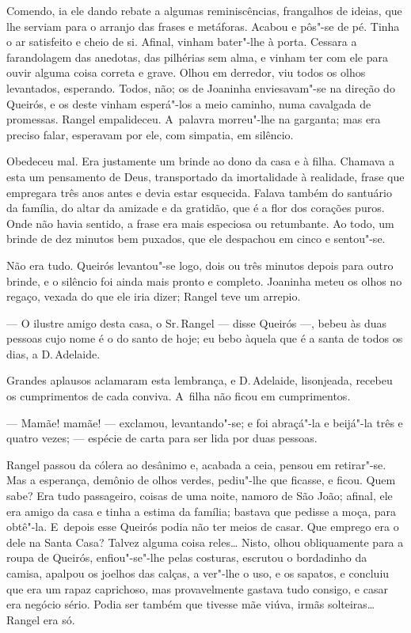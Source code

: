 \begin{linenumbers}
Comendo, ia ele dando rebate a algumas reminiscências, frangalhos de
ideias, que lhe serviam para o arranjo das frases e metáforas. Acabou e
pôs"-se de pé. Tinha o ar satisfeito e cheio de si. Afinal, vinham
bater"-lhe à porta. Cessara a farandolagem das anedotas, das pilhérias
sem alma, e vinham ter com ele para ouvir alguma coisa correta e grave.
Olhou em derredor, viu todos os olhos levantados, esperando. Todos, não;
os de Joaninha enviesavam"-se na direção do Queirós, e os deste vinham
esperá"-los a meio caminho, numa cavalgada de promessas. Rangel
empalideceu. A~palavra morreu"-lhe na garganta; mas era preciso falar,
esperavam por ele, com simpatia, em silêncio.

Obedeceu mal. Era justamente um brinde ao dono da casa e à filha.
Chamava a esta um pensamento de Deus, transportado da imortalidade à
realidade, frase que empregara três anos antes e devia estar esquecida.
Falava também do santuário da família, do altar da amizade e da
gratidão, que é a flor dos corações puros. Onde não havia sentido, a
frase era mais especiosa ou retumbante. Ao todo, um brinde de dez
minutos bem puxados, que ele despachou em cinco e sentou"-se.

Não era tudo. Queirós levantou"-se logo, dois ou três minutos depois para
outro brinde, e o silêncio foi ainda mais pronto e completo. Joaninha
meteu os olhos no regaço, vexada do que ele iria dizer; Rangel teve um
arrepio.

--- O ilustre amigo desta casa, o Sr.\,Rangel --- disse Queirós ---, bebeu
às duas pessoas cujo nome é o do santo de hoje; eu bebo àquela que é a
santa de todos os dias, a D.\,Adelaide.

Grandes aplausos aclamaram esta lembrança, e D.\,Adelaide, lisonjeada,
recebeu os cumprimentos de cada conviva. A~filha não ficou em
cumprimentos.

--- Mamãe! mamãe! --- exclamou, levantando"-se; e foi abraçá"-la e beijá"-la
três e quatro vezes; --- espécie de carta para ser lida por duas pessoas.

Rangel passou da cólera ao desânimo e, acabada a ceia, pensou em
retirar"-se. Mas a esperança, demônio de olhos verdes, pediu"-lhe que
ficasse, e ficou. Quem sabe? Era tudo passageiro, coisas de uma noite,
namoro de São João; afinal, ele era amigo da casa e tinha a estima da
família; bastava que pedisse a moça, para obtê"-la. E~depois esse Queirós
podia não ter meios de casar. Que emprego era o dele na Santa Casa?
Talvez alguma coisa reles\ldots{} Nisto, olhou obliquamente para a roupa de
Queirós, enfiou"-se"-lhe pelas costuras, escrutou o bordadinho da camisa,
apalpou os joelhos das calças, a ver"-lhe o uso, e os sapatos, e concluiu
que era um rapaz caprichoso, mas provavelmente gastava tudo consigo, e
casar era negócio sério. Podia ser também que tivesse mãe viúva, irmãs
solteiras\ldots{} Rangel era só.


\end{linenumbers}
